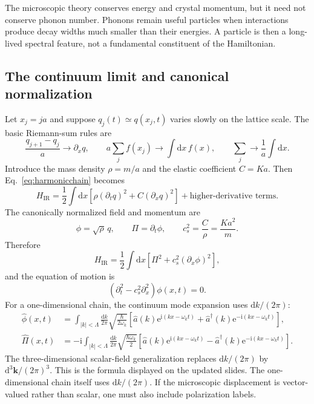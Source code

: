 \documentclass[11pt]{article}
\newcommand{\dd}{\mathrm{d}}
\newcommand{\e}{\mathrm{e}}
\newcommand{\ii}{\mathrm{i}}
\begin{document}
\begin{keyidea}
The microscopic theory conserves energy and crystal momentum, but it need not
conserve phonon number.  Phonons remain useful particles when interactions
produce decay widths much smaller than their energies.  A particle is then a
long-lived spectral feature, not a fundamental constituent of the Hamiltonian.
\end{keyidea}

\subsection{The continuum limit and canonical normalization}

Let $x_j=ja$ and suppose $q_j(t)\simeq q(x_j,t)$ varies slowly on the lattice
scale.  The basic Riemann-sum rules are
\begin{equation}
  \frac{q_{j+1}-q_j}{a}\longrightarrow\partial_xq,
  \qquad
  a\sum_j f(x_j)\longrightarrow\int\dd x\,f(x),
  \qquad
  \sum_j\longrightarrow\frac1a\int\dd x.
  \label{eq:riemannrules}
\end{equation}
Introduce the mass density $\rho=m/a$ and the elastic coefficient $C=Ka$.
Then Eq.~\eqref{eq:harmonicchain} becomes
\begin{equation}
  H_{\mathrm{IR}}
  =\frac12\int\dd x\left[
    \rho(\partial_tq)^2+C(\partial_xq)^2
  \right]+\text{higher-derivative terms}.
  \label{eq:qcontinuumH}
\end{equation}
The canonically normalized field and momentum are
\begin{equation}
  \phi=\sqrt\rho\,q,
  \qquad
  \Pi=\partial_t\phi,
  \qquad
  c_s^2=\frac C\rho=\frac{Ka^2}{m}.
  \label{eq:canonicalphi}
\end{equation}
Therefore
\begin{equation}
  \boxed{
  H_{\mathrm{IR}}
  =\frac12\int\dd x\left[
    \Pi^2+c_s^2(\partial_x\phi)^2
  \right],
  }
  \label{eq:continuumH}
\end{equation}
and the equation of motion is
\begin{equation}
  (\partial_t^2-c_s^2\partial_x^2)\phi(x,t)=0.
  \label{eq:soundwave}
\end{equation}
For a one-dimensional chain, the continuum mode expansion uses $\dd k/(2\pi)$:
\begin{align}
  \hat\phi(x,t)
  &=\int_{|k|<\Lambda}\frac{\dd k}{2\pi}
  \sqrt{\frac{\hbar}{2\omega_k}}
  \left[
    \hat a(k)\e^{\ii(kx-\omega_kt)}
    +\hat a^\dagger(k)\e^{-\ii(kx-\omega_kt)}
  \right],
  \label{eq:phimodeexpansion}
  \\
  \hat\Pi(x,t)
  &=-\ii\int_{|k|<\Lambda}\frac{\dd k}{2\pi}
  \sqrt{\frac{\hbar\omega_k}{2}}
  \left[
    \hat a(k)\e^{\ii(kx-\omega_kt)}
    -\hat a^\dagger(k)\e^{-\ii(kx-\omega_kt)}
  \right].
  \label{eq:Pimodeexpansion}
\end{align}
The three-dimensional scalar-field generalization replaces $\dd k/(2\pi)$
by $\dd^3\bm k/(2\pi)^3$.  This is the formula displayed on the updated
slides.  The one-dimensional chain itself uses $\dd k/(2\pi)$.  If the
microscopic displacement is vector-valued rather than scalar, one must also
include polarization labels.
\end{document}
